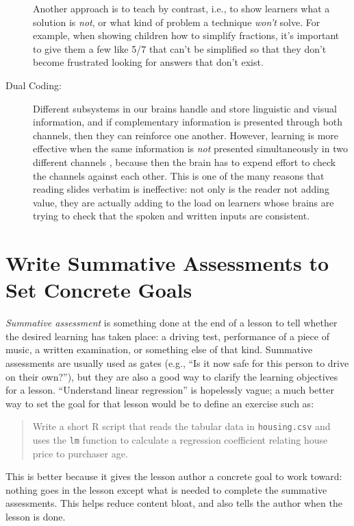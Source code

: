 \documentclass[10pt,letterpaper]{article}
\newcommand{\rulemajor}[1]{\section{#1}}
\begin{document}
\begin{description}
  Another approach is to teach by contrast, i.e., to show learners what a
  solution is \emph{not}, or what kind of problem a technique \emph{won't}
  solve. For example, when showing children how to simplify fractions, it's
  important to give them a few like 5/7 that can't be simplified so that they
  don't become frustrated looking for answers that don't exist.

\item[Dual Coding:] Different subsystems in our brains handle and store
  linguistic and visual information, and if complementary information is
  presented through both channels, then they can reinforce one another. However,
  learning is more effective when the same information is \emph{not} presented
  simultaneously in two different channels \cite{Maye2003,Maye2009}, because
  then the brain has to expend effort to check the channels against each other.
  This is one of the many reasons that reading slides verbatim is ineffective:
  not only is the reader not adding value, they are actually adding to the load
  on learners whose brains are trying to check that the spoken and written
  inputs are consistent.

\end{description}

\rulemajor{Write Summative Assessments to Set Concrete Goals}

\emph{Summative assessment} is something done at the end of a lesson to tell
whether the desired learning has taken place: a driving test, performance of a
piece of music, a written examination, or something else of that kind.
Summative assessments are usually used as gates (e.g., ``Is it now safe for this
person to drive on their own?''), but they are also a good way to clarify the
learning objectives for a lesson.  ``Understand linear regression'' is
hopelessly vague; a much better way to set the goal for that lesson would
be to define an exercise such as:

\begin{quotation}

  \noindent
  Write a short R script that reads the tabular data in \texttt{housing.csv}
  and uses the \texttt{lm} function to calculate a regression coefficient
  relating house price to purchaser age.

\end{quotation}

This is better because it gives the lesson author a concrete goal to work
toward: nothing goes in the lesson except what is needed to complete the
summative assessments.  This helps reduce content bloat, and also tells the
author when the lesson is done.
\end{document}
